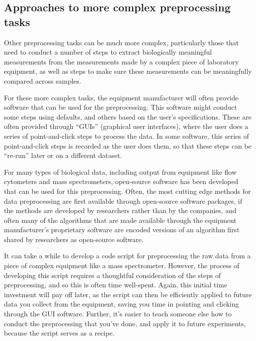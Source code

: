 \documentclass[]{tufte-book}
\begin{document}
\hypertarget{approaches-to-more-complex-preprocessing-tasks}{%
\subsection{Approaches to more complex preprocessing tasks}\label{approaches-to-more-complex-preprocessing-tasks}}

Other preprocessing tasks can be much more complex, particularly those that need
to conduct a number of steps to extract biologically meaningful measurements
from the measurements made by a complex piece of laboratory equipment, as well
as steps to make sure these measurements can be meaningfully compared across
samples.

For these more complex tasks, the equipment manufacturer will often provide
software that can be used for the preprocessing. This software might conduct
some steps using defaults, and others based on the user's specifications. These
are often provided through ``GUIs'' (graphical user interfaces), where the user
does a series of point-and-click steps to process the data. In some software,
this series of point-and-click steps is recorded as the user does them, so that
these steps can be ``re-run'' later or on a different dataset.

For many types of biological data, including output from equipment like flow
cytometers and mass spectrometers, open-source software has been developed
that can be used for this preprocessing. Often, the most cutting edge methods
for data preprocessing are first available through open-source software packages,
if the methods are developed by researchers rather than by the companies, and
often many of the algorithms that are made available through the equipment
manufacturer's proprietary software are encoded versions of an algorithm
first shared by researchers as open-source software.

It can take a while to develop a code script for preprocessing the raw data from
a piece of complex equipment like a mass spectrometer. However, the process of
developing this script requires a thoughtful consideration of the steps of
preprocessing, and so this is often time well-spent. Again, this initial time
investment will pay off later, as the script can then be efficiently applied to
future data you collect from the equipment, saving you time in pointing and
clicking through the GUI software. Further, it's easier to teach someone else
how to conduct the preprocessing that you've done, and apply it to future
experiments, because the script serves as a recipe.
\end{document}
